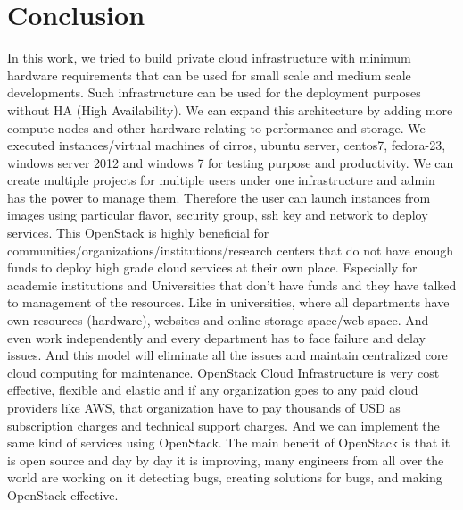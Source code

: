 \chapter{Conclusion}
In this work, we tried to build private cloud infrastructure with minimum hardware requirements that can be used for small scale and medium scale developments. Such infrastructure can be used for the deployment purposes without HA (High Availability). We can expand this architecture by adding more compute nodes and other hardware relating to performance and storage. We executed instances/virtual machines of cirros, ubuntu server, centos7, fedora-23, windows server 2012 and windows 7 for testing purpose and productivity. We can create multiple projects for multiple users under one infrastructure and admin has the power to manage them. Therefore the user can launch instances from images using particular flavor, security group, ssh key and network to deploy services. This OpenStack is highly beneficial for communities/organizations/institutions/research centers that do not have enough funds to deploy high grade cloud services at their own place. Especially for academic institutions and Universities that don't have funds and they have talked to management of the resources. Like in universities, where all departments have own resources (hardware), websites and online storage space/web space. And even work independently and every department has to face failure and delay issues. And this model will eliminate all the issues and maintain centralized core cloud computing for maintenance. OpenStack Cloud Infrastructure is very cost effective, flexible and elastic and if any organization goes to any paid cloud providers like AWS, that organization have to pay thousands of USD as subscription charges and technical support charges. And we can implement the same kind of services using OpenStack. The main benefit of OpenStack is that it is open source and day by day it is improving, many engineers from all over the world are working on it detecting bugs, creating solutions for bugs, and making OpenStack effective.